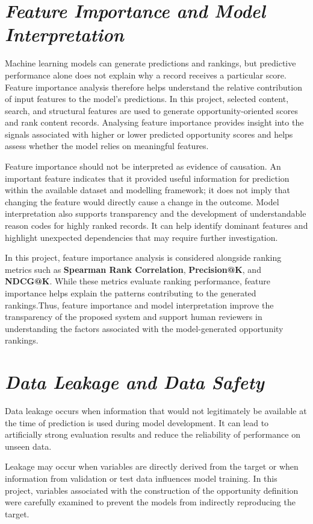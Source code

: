 \documentclass[12pt,a4paper]{report}
\begin{document}
\section{\textit{Feature Importance and Model Interpretation}}
Machine learning models can generate predictions and rankings, but predictive performance alone does not explain why a record receives a particular score. Feature importance analysis therefore helps understand the relative contribution of input features to the model's predictions. In this project, selected content, search, and structural features are used to generate opportunity-oriented scores and rank content records. Analysing feature importance provides insight into the signals associated with higher or lower predicted opportunity scores and helps assess whether the model relies on meaningful features.

Feature importance should not be interpreted as evidence of causation. An important feature indicates that it provided useful information for prediction within the available dataset and modelling framework; it does not imply that changing the feature would directly cause a change in the outcome. Model interpretation also supports transparency and the development of understandable reason codes for highly ranked records. It can help identify dominant features and highlight unexpected dependencies that may require further investigation.

In this project, feature importance analysis is considered alongside ranking metrics such as \textbf{Spearman Rank Correlation}, \textbf{Precision@K}, and \textbf{NDCG@K}. While these metrics evaluate ranking performance, feature importance helps explain the patterns contributing to the generated rankings.Thus, feature importance and model interpretation improve the transparency of the proposed system and support human reviewers in understanding the factors associated with the model-generated opportunity rankings.

\section{\textit{Data Leakage and Data Safety}}
Data leakage occurs when information that would not legitimately be available at the time of prediction is used during model development. It can lead to artificially strong evaluation results and reduce the reliability of performance on unseen data.

Leakage may occur when variables are directly derived from the target or when information from validation or test data influences model training. In this project, variables associated with the construction of the opportunity definition were carefully examined to prevent the models from indirectly reproducing the target.
\end{document}
